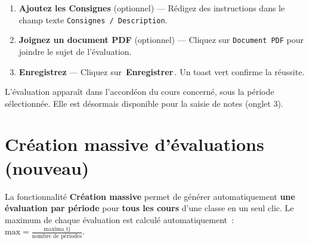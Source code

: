 \documentclass[12pt,a4paper]{report}
\newcommand{\champ}[1]{\texttt{\color{violet}#1}}
\newcommand{\bouton}[1]{{\colorbox{emerald}{\small\sffamily\bfseries\color{white}\,#1\,}}}
\begin{document}
\begin{etape}[title=Procédure détaillée : Créer une évaluation]
\begin{enumerate}[leftmargin=1.5cm,label=\textbf{\arabic*.},itemsep=12pt]
  \item \textbf{Ajoutez les Consignes} (optionnel) — Rédigez des instructions dans le champ texte \champ{Consignes / Description}.

  \item \textbf{Joignez un document PDF} (optionnel) — Cliquez sur \champ{Document PDF} pour joindre le sujet de l'évaluation.

  \item \textbf{Enregistrez} — Cliquez sur \bouton{Enregistrer}. Un toast vert confirme la réussite.
\end{enumerate}
\end{etape}

\begin{resultat}
L'\'evaluation appara\^it dans l'accord\'eon du cours concern\'e, sous la p\'eriode s\'electionn\'ee. Elle est d\'esormais disponible pour la saisie de notes (onglet 3).
\end{resultat}

\section{Cr\'eation massive d'\'evaluations (nouveau)}

La fonctionnalit\'e \textbf{Cr\'eation massive} permet de g\'en\'erer automatiquement \textbf{une \'evaluation par p\'eriode} pour \textbf{tous les cours} d'une classe en un seul clic. Le maximum de chaque \'evaluation est calcul\'e automatiquement~: $\text{max} = \frac{\text{maxima\_tj}}{\text{nombre de p\'eriodes}}$.
\end{document}
